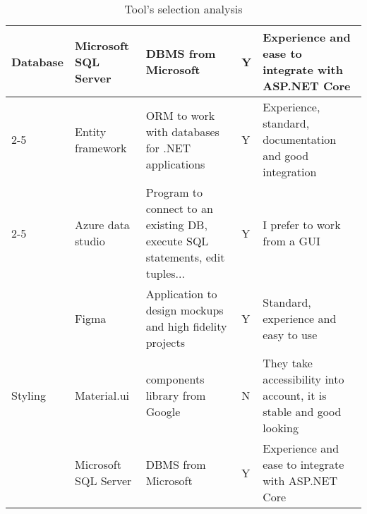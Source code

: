 \begin{table}[h]
{\begin{tabular}{|p{3cm}|p{2cm}|p{4cm}|p{2cm}|p{4cm}|}
        \hline \multirow{5}{*}{Database}  & Microsoft SQL Server &  DBMS from Microsoft & Y & Experience and ease to integrate with ASP.NET Core \\
        \cline{2-5}                      & Entity framework  & ORM to work with databases for .NET applications & Y & Experience, standard, documentation and good integration \\
        \cline{2-5}                      & Azure data studio  & Program to connect to an existing DB, execute SQL statements, edit tuples... & Y & I prefer to work from a GUI \\
        \hline \multirow{5}{*}{Styling}  & Figma & Application to design mockups and high fidelity projects & Y & Standard, experience and easy to use \\
        \cline{2-5}                      & Material.ui & components library from Google & N & They take accessibility into account, it is stable and good looking \\
        \hline \multirow{5}{*}{CI}  & Microsoft SQL Server &  DBMS from Microsoft & Y & Experience and ease to integrate with ASP.NET Core \\
        \hline
    \end{tabular}
    }
\caption{Tool's selection analysis}
\label{table:analysis_tools_selection}
\end{table}
